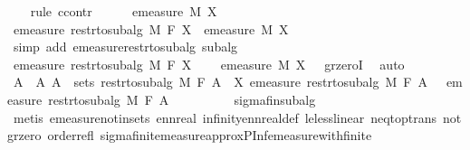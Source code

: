 \begin{isabellebody}
\ \ \isamarkupfalse%
\ {\isacharparenleft}{\kern0pt}rule\ ccontr{\isacharparenright}{\kern0pt}\isanewline
\ \ \ \ \isamarkupfalse%
\ {\isachardoublequoteopen}emeasure\ M\ X\ {\isasymnoteq}\ {}{\isachardoublequoteclose}\isanewline
\ \ \ \ \isamarkupfalse%
\ {\isachardoublequoteopen}emeasure\ {\isacharparenleft}{\kern0pt}restr{\isacharunderscore}{\kern0pt}to{\isacharunderscore}{\kern0pt}subalg\ M\ F{\isacharparenright}{\kern0pt}\ X\ {\isacharequal}{\kern0pt}\ emeasure\ M\ X{\isachardoublequoteclose}\ \isamarkupfalse%
\ {\isacharparenleft}{\kern0pt}simp\ add{\isacharcolon}{\kern0pt}\ emeasure{\isacharunderscore}{\kern0pt}restr{\isacharunderscore}{\kern0pt}to{\isacharunderscore}{\kern0pt}subalg\ subalg{\isacharparenright}{\kern0pt}\isanewline
\ \ \ \ \isamarkupfalse%
\ {\isachardoublequoteopen}emeasure\ {\isacharparenleft}{\kern0pt}restr{\isacharunderscore}{\kern0pt}to{\isacharunderscore}{\kern0pt}subalg\ M\ F{\isacharparenright}{\kern0pt}\ X\ {\isachargreater}{\kern0pt}\ {}{\isachardoublequoteclose}\ \isamarkupfalse%
\ {\isacartoucheopen}{\isasymnot}{\isacharparenleft}{\kern0pt}emeasure\ M\ X{\isacharparenright}{\kern0pt}\ {\isacharequal}{\kern0pt}\ {}{\isacartoucheclose}\ gr{\isacharunderscore}{\kern0pt}zeroI\ \isamarkupfalse%
\ auto\isanewline
\ \ \ \ \isamarkupfalse%
\ \isamarkupfalse%
\ A\ \ A{\isacharcolon}{\kern0pt}\ {\isachardoublequoteopen}A\ {\isasymin}\ sets\ {\isacharparenleft}{\kern0pt}restr{\isacharunderscore}{\kern0pt}to{\isacharunderscore}{\kern0pt}subalg\ M\ F{\isacharparenright}{\kern0pt}{\isachardoublequoteclose}\ {\isachardoublequoteopen}A\ {\isasymsubseteq}\ X{\isachardoublequoteclose}\ {\isachardoublequoteopen}emeasure\ {\isacharparenleft}{\kern0pt}restr{\isacharunderscore}{\kern0pt}to{\isacharunderscore}{\kern0pt}subalg\ M\ F{\isacharparenright}{\kern0pt}\ A\ {\isachargreater}{\kern0pt}\ {}{\isachardoublequoteclose}\ {\isachardoublequoteopen}emeasure\ {\isacharparenleft}{\kern0pt}restr{\isacharunderscore}{\kern0pt}to{\isacharunderscore}{\kern0pt}subalg\ M\ F{\isacharparenright}{\kern0pt}\ A\ {\isacharless}{\kern0pt}\ {\isasyminfinity}{\isachardoublequoteclose}\isanewline
\ \ \ \ \ \ \isamarkupfalse%
\ sigma{\isacharunderscore}{\kern0pt}fin{\isacharunderscore}{\kern0pt}subalg\ \isamarkupfalse%
\ {\isacharparenleft}{\kern0pt}metis\ emeasure{\isacharunderscore}{\kern0pt}notin{\isacharunderscore}{\kern0pt}sets\ ennreal{\isacharunderscore}{\kern0pt}{}\ infinity{\isacharunderscore}{\kern0pt}ennreal{\isacharunderscore}{\kern0pt}def\ le{\isacharunderscore}{\kern0pt}less{\isacharunderscore}{\kern0pt}linear\ neq{\isacharunderscore}{\kern0pt}top{\isacharunderscore}{\kern0pt}trans\ not{\isacharunderscore}{\kern0pt}gr{\isacharunderscore}{\kern0pt}zero\ order{\isacharunderscore}{\kern0pt}refl\ sigma{\isacharunderscore}{\kern0pt}finite{\isacharunderscore}{\kern0pt}measure{\isachardot}{\kern0pt}approx{\isacharunderscore}{\kern0pt}PInf{\isacharunderscore}{\kern0pt}emeasure{\isacharunderscore}{\kern0pt}with{\isacharunderscore}{\kern0pt}finite{\isacharparenright}{\kern0pt}\isanewline

\end{isabellebody}
